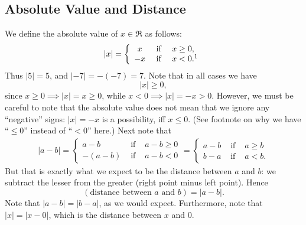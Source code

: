 \subsection{Absolute Value and Distance}
We define the absolute value of $x\in\Re$ as follows:
\begin{equation}
|x|=\left\{\begin{array}{ccl}x&\text{ if }&x\ge 0,\\
                            -x&\text{ if }&x<0.\footnotemark
           \end{array}\right.\label{AbsoluteValueDefined}
\end{equation}
Thus $|5|=5$, and $|-7|=-(-7)=7$.  Note that in all cases we
have
\begin{equation}|x|\ge0,\end{equation}
since $x\ge0\implies|x|=x\ge0$, while $x<0\implies|x|=-x>0$.
However, we must be careful to note that the absolute value
does not mean that we ignore any ``negative'' signs:
$|x|=-x$ is a possibility, iff $x\le0$. (See footnote on
why we have ``$\le0$'' instead of ``$<0$'' here.)
Next note that
\begin{align*}
|a-b|=\left\{\begin{array}{ccl}a-b&\text{ if }&a-b\ge0\\
                              -(a-b)&\text{ if }&a-b<0\end{array}\right.
     =\left\{\begin{array}{ccl}a-b&\text{ if }&a\ge b\\
                               b-a&\text{ if }&a<b.\end{array}\right.
\end{align*}
But that is exactly what we expect to be the distance between
$a$ and $b$: we subtract the lesser from the greater (right point
minus left point).  Hence
\begin{equation}
(\text{distance between $a$ and $b$})=|a-b|.\label{DistanceFromAtoB}
\end{equation}
Note that $|a-b|=|b-a|$, as we would expect.  Furthermore, note
that $|x|=|x-0|$, which is the distance between $x$ and $0$.

